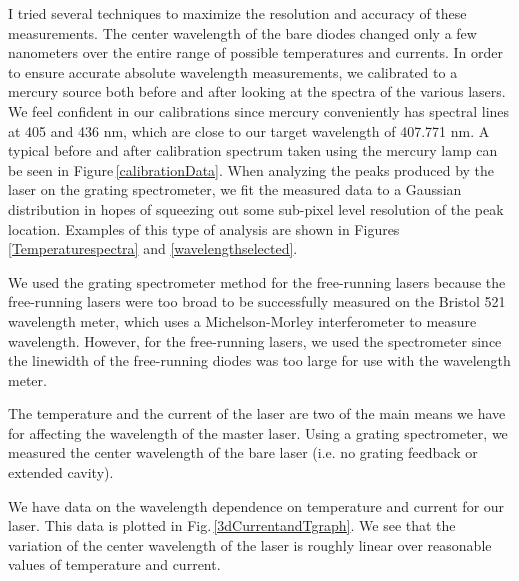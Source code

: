 I tried several techniques to maximize the resolution and accuracy of these measurements. The center wavelength of the bare diodes changed only a few nanometers over the entire range of possible temperatures and currents. In order to ensure accurate absolute wavelength measurements, we calibrated to a mercury source both before and after looking at the spectra of the various lasers. We feel confident in our calibrations since mercury conveniently has spectral lines at 405 and 436 nm, which are close to our target wavelength of 407.771 nm. A typical before and after calibration spectrum taken using the mercury lamp can be seen in Figure\,\ref{calibrationData}. When analyzing the peaks produced by the laser on the grating spectrometer, we fit the measured data to a Gaussian distribution in hopes of squeezing out some sub-pixel level resolution of the peak location. Examples of this type of analysis are shown in Figures\,\ref{Temperaturespectra} and \ref{wavelengthselected}.

We used the grating spectrometer method for the free-running lasers because the free-running lasers were too broad to be successfully measured on the Bristol 521 wavelength meter, which uses a Michelson-Morley interferometer to measure wavelength. However, for the free-running lasers, we used the spectrometer since the linewidth of the free-running diodes was too large for use with the wavelength meter. 


The temperature and the current of the laser are two of the main means we have for affecting the wavelength of the master laser. Using a grating spectrometer, we measured the center wavelength of the bare laser (i.e. no grating feedback or extended cavity).


We have data on the wavelength dependence on temperature and current for our laser. This data is plotted in Fig.\,\ref{3dCurrentandTgraph}. We see that the variation of the center wavelength of the laser is roughly linear over reasonable values of temperature and current.

